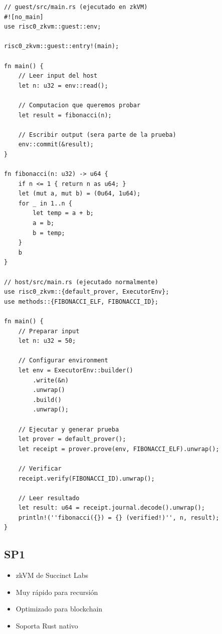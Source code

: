 \documentclass[11pt,a4paper,twoside]{book}
\begin{document}
\begin{example}
\begin{lstlisting}[style=rust]
// guest/src/main.rs (ejecutado en zkVM)
#![no_main]
use risc0_zkvm::guest::env;

risc0_zkvm::guest::entry!(main);

fn main() {
    // Leer input del host
    let n: u32 = env::read();
    
    // Computacion que queremos probar
    let result = fibonacci(n);
    
    // Escribir output (sera parte de la prueba)
    env::commit(&result);
}

fn fibonacci(n: u32) -> u64 {
    if n <= 1 { return n as u64; }
    let (mut a, mut b) = (0u64, 1u64);
    for _ in 1..n {
        let temp = a + b;
        a = b;
        b = temp;
    }
    b
}

// host/src/main.rs (ejecutado normalmente)
use risc0_zkvm::{default_prover, ExecutorEnv};
use methods::{FIBONACCI_ELF, FIBONACCI_ID};

fn main() {
    // Preparar input
    let n: u32 = 50;
    
    // Configurar environment
    let env = ExecutorEnv::builder()
        .write(&n)
        .unwrap()
        .build()
        .unwrap();
    
    // Ejecutar y generar prueba
    let prover = default_prover();
    let receipt = prover.prove(env, FIBONACCI_ELF).unwrap();
    
    // Verificar
    receipt.verify(FIBONACCI_ID).unwrap();
    
    // Leer resultado
    let result: u64 = receipt.journal.decode().unwrap();
    println!(''fibonacci({}) = {} (verified!)'', n, result);
}
\end{lstlisting}
\end{example}

\subsection{SP1}

\begin{itemize}
    \item zkVM de Succinct Labs
    \item Muy r\'apido para recursi\'on
    \item Optimizado para blockchain
    \item Soporta Rust nativo
\end{itemize}
\end{document}
